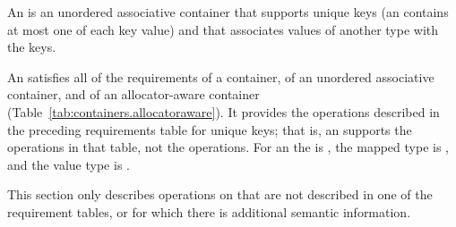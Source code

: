 \documentclass[american,twoside]{book}
\begin{document}
\pnum
{}%
%
An  is an unordered associative container that
supports unique keys (an  contains at most one of each
key value) and that associates values of another type
 with the keys.

\pnum
An  satisfies all of the requirements of a container, of an unordered associative container, and of an allocator-aware container (Table~\ref{tab:containers.allocatoraware}). It provides the operations described in the preceding requirements table for unique keys; that is, an  supports the  operations in that table, not the  operations. For an  the  is , the mapped type is , and the value type is .

\pnum
This section only describes operations on  that
are not described in one of the requirement tables, or for which there
is additional semantic information.
\end{document}
